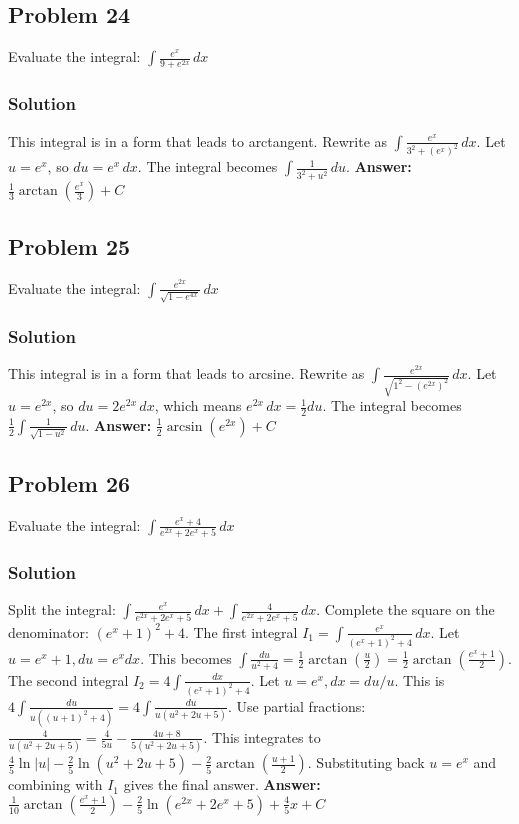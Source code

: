\documentclass{article}
\begin{document}
\subsection{Problem 24}
Evaluate the integral: $ \int \frac{e^x}{9 + e^{2x}} \,dx $
\subsubsection*{Solution}
This integral is in a form that leads to arctangent.
Rewrite as $ \int \frac{e^x}{3^2 + (e^x)^2} \,dx $.
Let $u = e^x$, so $du = e^x \,dx$.
The integral becomes $ \int \frac{1}{3^2+u^2} \,du $.
\textbf{Answer:} $ \frac{1}{3}\arctan\left(\frac{e^x}{3}\right) + C $

\subsection{Problem 25}
Evaluate the integral: $ \int \frac{e^{2x}}{\sqrt{1 - e^{4x}}} \,dx $
\subsubsection*{Solution}
This integral is in a form that leads to arcsine.
Rewrite as $ \int \frac{e^{2x}}{\sqrt{1^2 - (e^{2x})^2}} \,dx $.
Let $u = e^{2x}$, so $du = 2e^{2x} \,dx$, which means $e^{2x}\,dx = \frac{1}{2}du$.
The integral becomes $ \frac{1}{2} \int \frac{1}{\sqrt{1-u^2}} \,du $.
\textbf{Answer:} $ \frac{1}{2}\arcsin(e^{2x}) + C $

\subsection{Problem 26}
Evaluate the integral: $ \int \frac{e^x + 4}{e^{2x} + 2e^x + 5} \,dx $
\subsubsection*{Solution}
Split the integral: $ \int \frac{e^x}{e^{2x} + 2e^x + 5} \,dx + \int \frac{4}{e^{2x} + 2e^x + 5} \,dx $.
Complete the square on the denominator: $(e^x+1)^2+4$.
The first integral $I_1 = \int \frac{e^x}{(e^x+1)^2+4} \,dx$. Let $u=e^x+1, du=e^x dx$. This becomes $\int \frac{du}{u^2+4} = \frac{1}{2}\arctan(\frac{u}{2}) = \frac{1}{2}\arctan(\frac{e^x+1}{2})$.
The second integral $I_2 = 4 \int \frac{dx}{(e^x+1)^2+4}$. Let $u=e^x, dx=du/u$. This is $4 \int \frac{du}{u((u+1)^2+4)} = 4 \int \frac{du}{u(u^2+2u+5)}$.
Use partial fractions: $ \frac{4}{u(u^2+2u+5)} = \frac{4}{5u} - \frac{4u+8}{5(u^2+2u+5)} $.
This integrates to $ \frac{4}{5}\ln|u| - \frac{2}{5}\ln(u^2+2u+5) - \frac{2}{5}\arctan(\frac{u+1}{2}) $.
Substituting back $u=e^x$ and combining with $I_1$ gives the final answer.
\textbf{Answer:} $ \frac{1}{10}\arctan\left(\frac{e^x+1}{2}\right) - \frac{2}{5}\ln(e^{2x}+2e^x+5) + \frac{4}{5}x + C $
\end{document}
